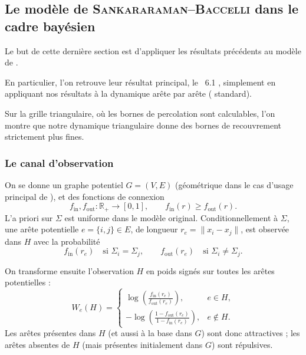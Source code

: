 \subsection{Le modèle de \textsc{Sankararaman--Baccelli} dans le cadre bayésien}
\label{sec:chapII_SB}

Le but de cette dernière section est d'appliquer les résultats précédents au modèle de \SB{} \cite{SankararamanBaccelli2018}.

En particulier, l'on retrouve leur résultat principal, le \Th~6.1 \cite{SankararamanBaccelli2018}, simplement en appliquant nos résultats à la dynamique arête par arête (\SW{} standard).

Sur la grille triangulaire, où les bornes de percolation sont calculables, l'on montre que notre dynamique triangulaire donne des bornes de recouvrement strictement plus fines.

\subsubsection{Le canal d'observation}

On se donne un graphe potentiel $G=(V,E)$ (géométrique dans le cas d'usage principal de \SB{}), et des fonctions de connexion
\[
    f_{\mathrm{in}},f_{\mathrm{out}}:\mathbb R_+\to[0,1],
    \qquad
    f_{\mathrm{in}}(r)\ge f_{\mathrm{out}}(r).
\]
L'a priori sur $\Sigma$ est uniforme dans le modèle original. Conditionnellement à $\Sigma$, une arête potentielle $e=\{i,j\} \in E$, de longueur $r_e=\|x_i-x_j\|$, est observée dans $H$ avec la probabilité
\[
    f_{\mathrm{in}}(r_e)\quad\text{si }\Sigma_i=\Sigma_j,
    \qquad
    f_{\mathrm{out}}(r_e)\quad\text{si }\Sigma_i\neq\Sigma_j.
\]

On transforme ensuite l'observation $H$ en poids signés sur toutes les arêtes potentielles :
\begin{equation}
    W_e(H)=
    \begin{cases}
        \displaystyle \log\left(\frac{f_{\mathrm{in}}(r_e)}{f_{\mathrm{out}}(r_e)}\right),& e\in H,\\[2ex]
        \displaystyle -\log\left(\frac{1-f_{\mathrm{out}}(r_e)}{1-f_{\mathrm{in}}(r_e)}\right),& e\notin H.
    \end{cases}
    \label{eq:chapII_SB_weights}
\end{equation}
Les arêtes présentes dans $H$ (et aussi à la base dans $G$) sont donc attractives ; les arêtes absentes de $H$ (mais présentes initialement dans $G$) sont répulsives. %

